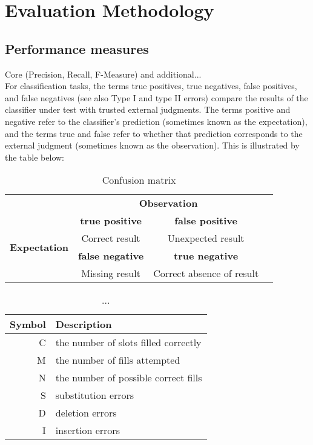 \section{Evaluation Methodology}
\label{sec:evaluation-methodology}


\subsection{Performance measures}
Core (Precision, Recall, F-Measure) and additional...
\\
For classification tasks, the terms true positives, true negatives, false positives, and false negatives (see also Type I and type II errors) compare the results of the classifier under test with trusted external judgments. The terms positive and negative refer to the classifier's prediction (sometimes known as the expectation), and the terms true and false refer to whether that prediction corresponds to the external judgment (sometimes known as the observation). This is illustrated by the table below:

\begin{table}[H]
\centering
\begin{tabular}{cccc}
	& \multicolumn{2}{c}{\textbf{Observation}} \\
	\multirow{4}{*}{\textbf{Expectation}} & \textbf{true positive}  & \textbf{false positive} \\
	& Correct result & Unexpected result \\
	& \textbf{false negative} & \textbf{true negative} \\
         & Missing result & Correct absence of result
\end{tabular}
\caption{Confusion matrix}
\end{table}

\begin{table}[H]
\centering
\begin{tabular*}{\textwidth}{rl}
	\toprule
	\textbf{Symbol} & \textbf{Description} \\
	\midrule
	C & the number of slots filled correctly \\
	M & the number of fills attempted \\
	N & the number of possible correct fills  \\
	S & substitution errors \\
	D & deletion errors \\
	I & insertion errors \\
	\bottomrule
\end{tabular*}
\caption{...}
\end{table}

